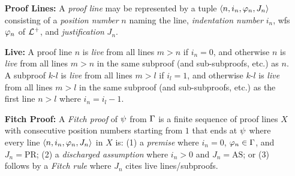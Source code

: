\documentclass[a4paper, 11pt]{article} %
\begin{document}
\begin{enumerate}
  \item[\bf Proof Lines:] A \textit{proof line} may be represented by a tuple $\langle n,i_n,\varphi_n,J_n\rangle$ consisting of a \textit{position number} $n$ naming the line, \textit{indentation number} $i_n$, wfs $\varphi_n$ of $\mathcal{L}^+$, and \textit{justification} $J_n$. %
  \item[\bf Live:]
    A proof line $n$ is \textit{live} from all lines $m > n$ if $i_n = 0$, and otherwise $n$ is \textit{live} from all lines $m > n$ in the same subproof (and sub-subproofs, etc.) as $n$.
    A subproof $k$-$l$ is \textit{live} from all lines $m > l$ if $i_l = 1$, and otherwise $k$-$l$ is \textit{live} from all lines $m > l$ in the same subproof (and sub-subproofs, etc.) as the first line $n > l$ where $i_n = i_l - 1$. 
  \item[\bf Fitch Proof:] A \textit{Fitch proof} of $\psi$ from $\Gamma$ is a finite sequence of proof lines $X$ with consecutive position numbers starting from $1$ that ends at $\psi$ where every line $\langle n,i_n,\varphi_n,J_n\rangle$ in $X$ is: (1) a \textit{premise} where $i_n = 0$, $\varphi_n \in \Gamma$, and $J_n = \text{PR}$; (2) a \textit{discharged assumption} where $i_n > 0$ and $J_n = \text{AS}$; or (3) follows by a \textit{Fitch rule} where $J_n$ cites live lines/subproofs.

\end{enumerate}
\end{document}
